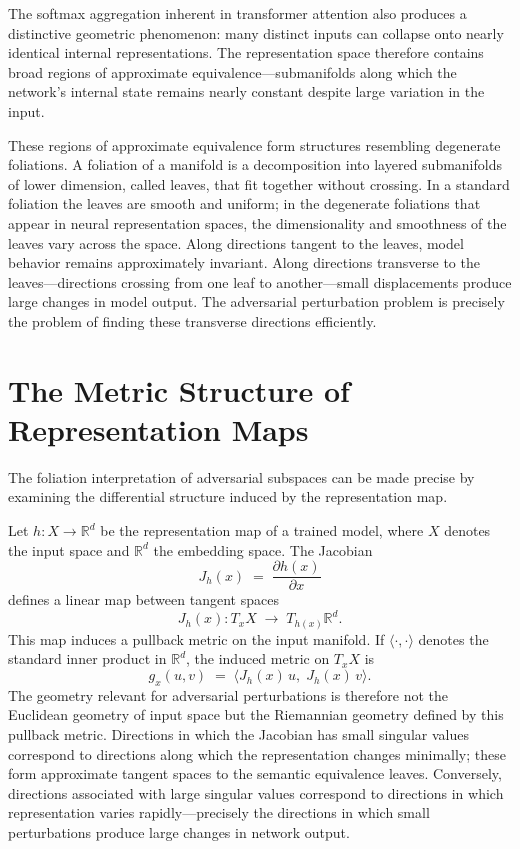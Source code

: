 \documentclass[12pt,a4paper]{article}
\theoremstyle{plain}
\theoremstyle{definition}
\begin{document}
The softmax aggregation inherent in transformer attention also produces a
distinctive geometric phenomenon: many distinct inputs can collapse onto nearly
identical internal representations. The representation space therefore contains
broad regions of approximate equivalence---submanifolds along which the
network's internal state remains nearly constant despite large variation in the
input.

These regions of approximate equivalence form structures resembling degenerate
foliations. A foliation of a manifold is a decomposition into layered
submanifolds of lower dimension, called leaves, that fit together without
crossing. In a standard foliation the leaves are smooth and uniform; in the
degenerate foliations that appear in neural representation spaces, the
dimensionality and smoothness of the leaves vary across the space. Along
directions tangent to the leaves, model behavior remains approximately
invariant. Along directions transverse to the leaves---directions crossing
from one leaf to another---small displacements produce large changes in model
output. The adversarial perturbation problem is precisely the problem of
finding these transverse directions efficiently.

\section{The Metric Structure of Representation Maps}

The foliation interpretation of adversarial subspaces can be made precise by
examining the differential structure induced by the representation map.

Let $h : X \to \mathbb{R}^d$ be the representation map of a trained model,
where $X$ denotes the input space and $\mathbb{R}^d$ the embedding space. The
Jacobian
\[
J_h(x) \;=\; \frac{\partial h(x)}{\partial x}
\]
defines a linear map between tangent spaces
\[
J_h(x) : T_x X \;\longrightarrow\; T_{h(x)} \mathbb{R}^d.
\]
This map induces a pullback metric on the input manifold. If $\langle
\cdot, \cdot \rangle$ denotes the standard inner product in $\mathbb{R}^d$,
the induced metric on $T_x X$ is
\[
g_x(u, v) \;=\; \bigl\langle J_h(x)\,u,\; J_h(x)\,v \bigr\rangle.
\]
The geometry relevant for adversarial perturbations is therefore not the
Euclidean geometry of input space but the Riemannian geometry defined by this
pullback metric. Directions in which the Jacobian has small singular values
correspond to directions along which the representation changes minimally; these
form approximate tangent spaces to the semantic equivalence leaves. Conversely,
directions associated with large singular values correspond to directions in
which representation varies rapidly---precisely the directions in which small
perturbations produce large changes in network output.
\end{document}
